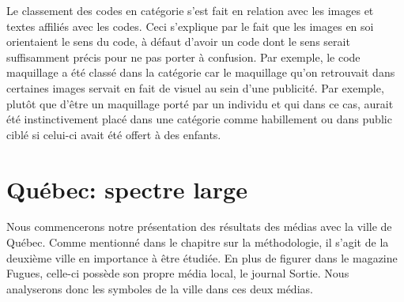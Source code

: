 Le classement des codes en catégorie s'est fait en relation avec les images et textes affiliés avec les codes. Ceci s'explique par le fait que les images en soi orientaient le sens du code, à défaut d'avoir un code dont le sens serait suffisamment précis pour ne pas porter à confusion. 
Par exemple, le code maquillage a été classé dans la catégorie  car le maquillage qu'on retrouvait dans certaines images servait en fait de visuel au sein d'une publicité. Par exemple, plutôt que d'être un maquillage porté par un individu et qui dans ce cas, aurait été instinctivement placé dans une catégorie comme habillement ou dans public ciblé si celui-ci avait été offert à des enfants.

\section{Québec: spectre large}
\label{sec:qu_bec_spectre_large}
Nous commencerons notre présentation des résultats des médias avec la ville de Québec. 
Comme mentionné dans le chapitre sur la méthodologie, il s'agit de la deuxième ville en importance à être étudiée. 
En plus de figurer dans le magazine Fugues, celle-ci possède son propre média local, le journal Sortie. 
Nous analyserons donc les symboles de la ville dans ces deux médias.

